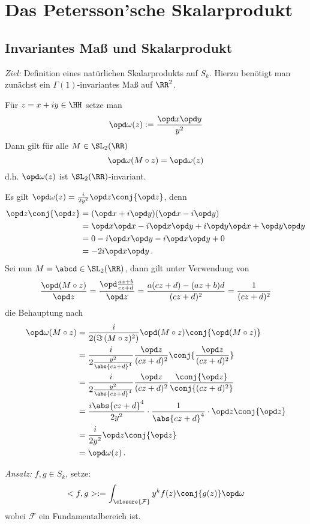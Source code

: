 \chapter{Das Petersson'sche Skalarprodukt}
\section{Invariantes Maß und Skalarprodukt}

\emph{Ziel:} Definition eines \glqq{}natürlichen\grqq{} Skalarprodukts auf $S_k$. Hierzu benötigt man zunächst ein $\Gamma(1)$-invariantes Maß auf $\RR^2$.

\begin{defi}
Für $z = x + iy \in \HH$ setze man
\[
\opd \omega(z) := \frac {\opd x \opd y}{y^2}
\]
Dann gilt für alle $M \in \SL_2(\RR)$
\[
\opd \omega(M \circ z) = \opd \omega(z) 
\]
d.h. $\opd \omega(z)$ ist $\SL_2(\RR)$-invariant.
\end{defi}

\begin{bewe}
Es gilt $\opd \omega(z) = \frac {i}{2y^2} \opd z \conj{\opd z}$, denn
\begin{align*}
\opd z \conj{\opd z} &= (\opd x + i \opd y)(\opd x - i \opd y)\\
&= \opd x \opd x - i \opd x \opd y + i \opd y \opd x + \opd y \opd y\\
&= 0 - i \opd x \opd y - i \opd x \opd y + 0\\
&= -2i \opd x \opd y\,.
\end{align*}
Sei nun $M = \abcd \in \SL_2(\RR)$, dann gilt unter Verwendung von
\[
\frac {\opd (M \circ z)}{\opd z} = \frac {\opd \frac{az + b}{cz + d}}{\opd z} = \frac {a(cz+d) - (az+b)d}{(cz+d)^2} = \frac{1}{(cz+d)^2}
\]
die Behauptung nach
\begin{align*}
\opd \omega(M \circ z) &= \frac {i}{2 (\Im \left(M \circ z)^2\right)} \opd (M \circ z) \conj{\opd (M \circ z)}\\
&= \frac {i}{2 \frac{y^2}{\abs{cz+d}^4}} \frac{\opd z}{(cz+d)^2} \conj{\frac {\opd z} {(cz+d)^2}}\\
&= \frac {i}{2 \frac{y^2}{\abs{cz+d}^4}} \frac{\opd z}{(cz+d)^2} \frac {\conj{\opd z}} {\conj{(cz+d)^2}}\\
&= \frac{i \abs{cz+d}^4}{2 y^2} \cdot \frac {1}{\abs{cz+d}^4} \cdot \opd z \conj{\opd z}\\
&= \frac {i}{2y^2} \opd z \conj{\opd z}\\
&= \opd \omega(z)\,.
\end{align*}
\end{bewe}

\emph{Ansatz:} $f, g \in S_k$, setze:
\[
<f,g> := \int_{\closure{\mathcal F}} y^k f(z) \conj{g(z)} \opd \omega
\]
wobei $\mathcal F$ ein Fundamentalbereich ist.













